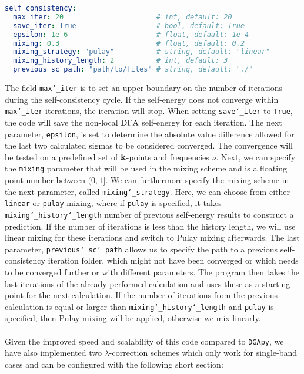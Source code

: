 \documentclass[\main/main.tex]{subfiles}
\begin{document}
\begin{minipage}{\textwidth}%
\begin{lstlisting}[language=yaml]
self_consistency:
  max_iter: 20                      # int, default: 20
  save_iter: True                   # bool, default: True
  epsilon: 1e-6                     # float, default: 1e-4
  mixing: 0.3                       # float, default: 0.2
  mixing_strategy: "pulay"          # string, default: "linear"
  mixing_history_length: 2          # int, default: 3
  previous_sc_path: "path/to/files" # string, default: "./"
\end{lstlisting}
\end{minipage}
The field \texttt{max\char`_iter} is to set an upper boundary on the number of iterations during the self-consistency cycle. If the self-energy does not converge within \texttt{max\char`_iter} iterations, the iteration will stop. When setting \texttt{save\char`_iter} to \texttt{True}, the code will save the non-local $\text{D}\Gamma\text{A}$ self-energy for each iteration. The next parameter, \texttt{epsilon}, is set to determine the absolute value difference allowed for the last two calculated sigmas to be considered converged. The convergence will be tested on a predefined set of $\textbf{k}$-points and frequencies $\nu$. Next, we can specify the \texttt{mixing} parameter that will be used in the mixing scheme and is a floating point number between $(0,1]$. We can furthermore specify the mixing scheme in the next parameter, called \texttt{mixing\char`_strategy}. Here, we can choose from either \texttt{linear} or \texttt{pulay} mixing, where if \texttt{pulay} is specified, it takes \texttt{mixing\char`_history\char`_length} number of previous self-energy results to construct a prediction. If the number of iterations is less than the history length, we will use linear mixing for these iterations and switch to Pulay mixing afterwards. The last parameter, \texttt{previous\char`_sc\char`_path} allows us to specify the path to a previous self-consistency iteration folder, which might not have been converged or which needs to be converged further or with different parameters. The program then takes the last iterations of the already performed calculation and uses these as a starting point for the next calculation. If the number of iterations from the previous calculation is equal or larger than \texttt{mixing\char`_history\char`_length} and \texttt{pulay} is specified, then Pulay mixing will be applied, otherwise we mix linearly.
\\\\
Given the improved speed and scalability of this code compared to \texttt{DGApy}, we have also implemented two $\lambda$-correction schemes which only work for single-band cases and can be configured with the following short section:
\end{document}
